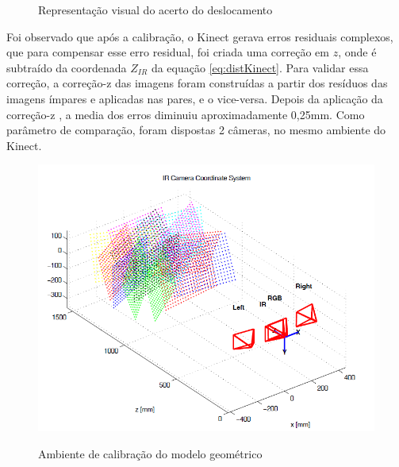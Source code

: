 \begin{figure}[!h]
	\centering
	\caption{Representação visual do acerto do deslocamento}
   \label{fig:deslocKinect}
\end{figure}

Foi observado que após a calibração, o Kinect gerava erros residuais complexos, que para compensar esse erro residual, foi criada uma correção em $z$, onde é subtraído da coordenada $Z_{IR}$ da equação \ref{eq:distKinect}.
Para validar essa correção, a correção-z das imagens foram construídas a partir dos resíduos das imagens ímpares e aplicadas nas pares, e o vice-versa. Depois da aplicação da correção-z , a media dos erros diminuiu aproximadamente 0,25mm.
Como parâmetro de comparação, foram dispostas 2 câmeras, no mesmo ambiente do Kinect.

\begin{figure}[!h]
	\centering
	\caption{Ambiente de calibração do modelo geométrico}
	\includegraphics[width=0.5\linewidth]{figs/ambientekinect.png}
   \label{fig:ambienteKinect}
\end{figure}

